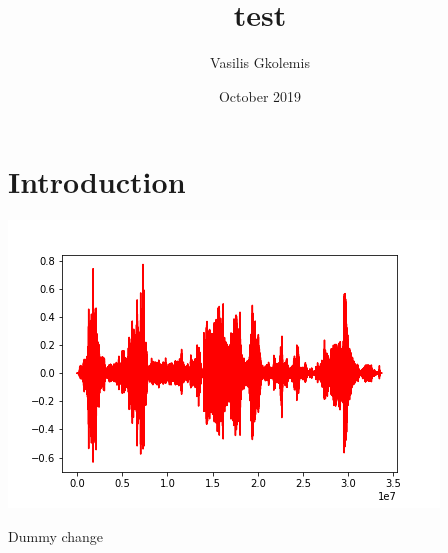 \documentclass{article}
\title{test}
\author{Vasilis Gkolemis}
\date{October 2019}
\begin{document}
\maketitle

\section{Introduction}

\includegraphics{fig_01.png}



Dummy change
\end{document}
